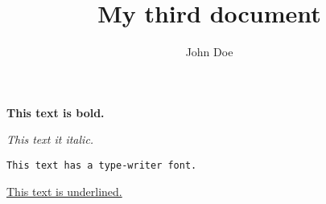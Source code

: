 \documentclass{article}
\title{My third document}
\author{John Doe}
\begin{document}
   \maketitle
   
   \textbf{This text is bold.}
   
   \textit{This text it italic.}
   
   \texttt{This text has a type-writer font.}
   
   \underline{This text is underlined.}
\end{document}
